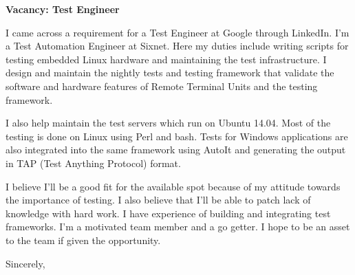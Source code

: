 \documentclass[12pt]{extletter}
\newcommand{\jobPosition}{Test Engineer}
\newcommand{\companyName}{Google}
\begin{document}
\begin{letter}{}

\opening{\textbf{Vacancy: {\jobPosition}}}
 
I came across a requirement for a {\jobPosition} at {\companyName} through
LinkedIn. I'm a Test Automation Engineer at Sixnet. Here my duties include
writing scripts for testing embedded Linux hardware and maintaining the test
infrastructure. I design and maintain the nightly tests and testing framework
that validate the software and hardware features of Remote Terminal Units and
the testing framework.

I also help maintain the test servers which run on Ubuntu 14.04. Most of the
testing is done on Linux using Perl and bash. Tests for Windows applications
are also integrated into the same framework using AutoIt and generating the
output in TAP (Test Anything Protocol) format.

I believe I'll be a good fit for the available spot because of my attitude
towards the importance of testing. I also believe that I'll be able to patch
lack of knowledge with hard work. I have experience of building and integrating
test frameworks. I'm a motivated team member and a go getter. I hope to be an
asset to the team if given the opportunity.

\vspace{2\parskip} %
\closing{Sincerely,}
\vspace{2\parskip} %

\end{letter}
 
\end{document}
